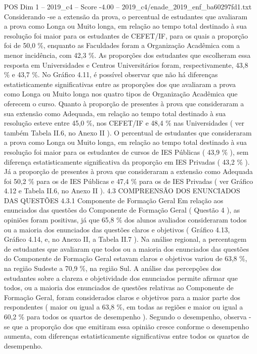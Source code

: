 \begin{textsample}{POS Dim 1 – 2019\_c4 – Score -4.00 – 2019\_c4/enade\_2019\_enf\_ba60297fd1.txt}
Considerando -se a extensão da prova, o percentual de estudantes que avaliaram a prova como Longa ou Muito longa, em relação ao tempo total destinado à sua resolução foi maior para os estudantes de CEFET/IF, para os quais a proporção foi de 50,0 \%, enquanto as Faculdades foram a Organização Acadêmica com a menor incidência, com 42,3 \%.
As proporções dos estudantes que escolheram essa resposta em Universidades e Centros Universitários foram, respectivamente, 43,8 \% e 43,7 \%.
No Gráfico 4.11, é possível observar que não há diferenças estatisticamente significativas entre as proporções dos que avaliaram a prova como Longa ou Muito longa nos quatro tipos de Organização Acadêmica que oferecem o curso.
Quanto à proporção de presentes à prova que consideraram a sua extensão como Adequada, em relação ao tempo total destinado à sua resolução esteve entre 45,0 \%, nos CEFET/IF e 48,4 \% nas Universidades ( ver também Tabela II.6, no Anexo II ).
O percentual de estudantes que consideraram a prova como Longa ou Muito longa, em relação ao tempo total destinado à sua resolução foi maior para os estudantes de cursos de IES Públicas ( 43,9 \% ), sem diferença estatisticamente significativa da proporção em IES Privadas ( 43,2 \% ).
Já a proporção de presentes à prova que consideraram a extensão como Adequada foi 50,2 \% para os de IES Públicas e 47,4 \% para os de IES Privadas ( ver Gráfico 4.12 e Tabela II.6, no Anexo II ). 4.3 COMPREENSÃO DOS ENUNCIADOS DAS QUESTÕES 4.3.1 Componente de Formação Geral Em relação aos enunciados das questões do Componente de Formação Geral ( Questão 4 ), as opiniões foram positivas, já que 65,8 \% dos alunos avaliados consideraram todos ou a maioria dos enunciados das questões claros e objetivos ( Gráfico 4.13, Gráfico 4.14, e, no Anexo II, a Tabela II.7 ).
Na análise regional, a percentagem de estudantes que avaliaram que todos ou a maioria dos enunciados das questões do Componente de Formação Geral estavam claros e objetivos variou de 63,8 \%, na região Sudeste a 70,9 \%, na região Sul.
A análise das percepções dos estudantes sobre a clareza e objetividade dos enunciados permite afirmar que todos, ou a maioria dos enunciados de questões relativas ao Componente de Formação Geral, foram considerados claros e objetivos para a maior parte dos respondentes ( maior ou igual a 63,8 \%, em todas as regiões e maior ou igual a 60,2 \% para todos os quartos de desempenho ).
Segundo o desempenho, observa -se que a proporção dos que emitiram essa opinião cresce conforme o desempenho aumenta, com diferenças estatisticamente significativas entre todos os quartos de desempenho.

\end{textsample}
